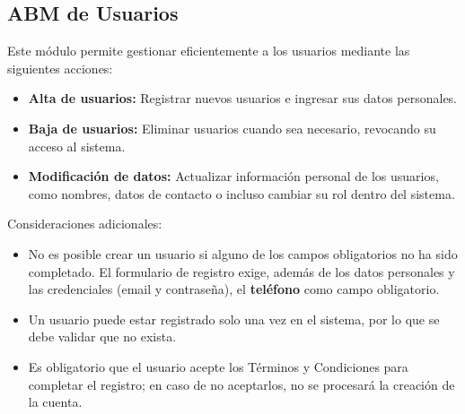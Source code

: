 \documentclass[a4paper,12pt]{article}
\begin{document}
    \subsection{ABM de Usuarios}
    \par Este módulo permite gestionar eficientemente a los usuarios mediante las siguientes acciones:
    \begin{itemize}
        \item \textbf{Alta de usuarios:} Registrar nuevos usuarios e ingresar sus datos personales.
        \item \textbf{Baja de usuarios:} Eliminar usuarios cuando sea necesario, revocando su acceso al sistema.
        \item \textbf{Modificación de datos:} Actualizar información personal de los usuarios, como nombres, datos de contacto o incluso cambiar su rol dentro del sistema.
    \end{itemize}
    \par Consideraciones adicionales:
    \begin{itemize}
        \item No es posible crear un usuario si alguno de los campos obligatorios no ha sido completado. El formulario de registro exige, además de los datos personales y las credenciales (email y contraseña), el \textbf{teléfono} como campo obligatorio.
        \item Un usuario puede estar registrado solo una vez en el sistema, por lo que se debe validar que no exista.
        \item Es obligatorio que el usuario acepte los Términos y Condiciones para completar el registro; en caso de no aceptarlos, no se procesará la creación de la cuenta.
    \end{itemize}
\end{document}

